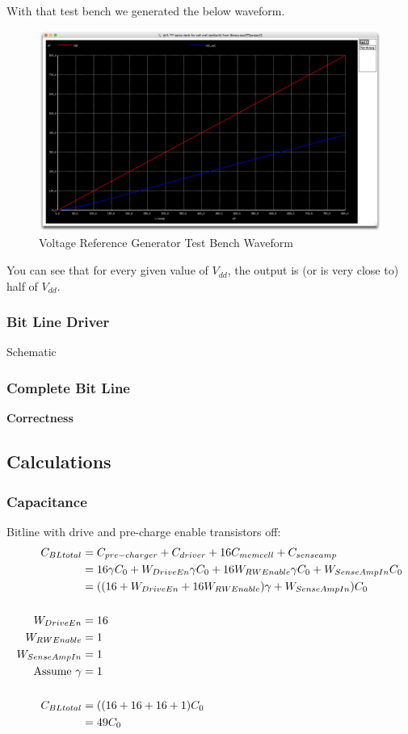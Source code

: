 \documentclass[a4paper]{article}
\begin{document}
With that test bench we generated the below waveform.\\

\begin{figure}[H]
	\centering
	\includegraphics[scale=0.1]{vRefTestWave}
	\caption{Voltage Reference Generator Test Bench Waveform}
	\label{fig:vRefTestWave}
\end{figure}

You can see that for every given value of $V_{dd}$, the output is (or is very close to) half of $V_{dd}$.

\subsubsection{Bit Line Driver}
Schematic
\subsubsection{Complete Bit Line}
\textbf{Correctness}

\subsection{Calculations}
\subsubsection{Capacitance}
Bitline with drive and pre-charge enable transistors off:
\begin{align*}
C_{BLtotal} &= C_{pre-charger} + C_{driver} + 16 C_{memcell} + C_{senseamp}\\
&= 16 \gamma C_0 + W_{DriveEn}\gamma C_0 + 16 W_{RWEnable}\gamma C_0 + W_{SenseAmpIn} C_0\\
&= ((16 + W_{DriveEn}  + 16 W_{RWEnable})\gamma + W_{SenseAmpIn})C_0\\\\
W_{DriveEn} &= 16\\
W_{RWEnable} &= 1\\
W_{SenseAmpIn} &= 1\\
\textnormal{Assume }\gamma &= 1\\\\
C_{BLtotal} &= ((16 + 16 + 16 + 1)C_0\\
&= 49C_0
\end{align*}
\end{document}

